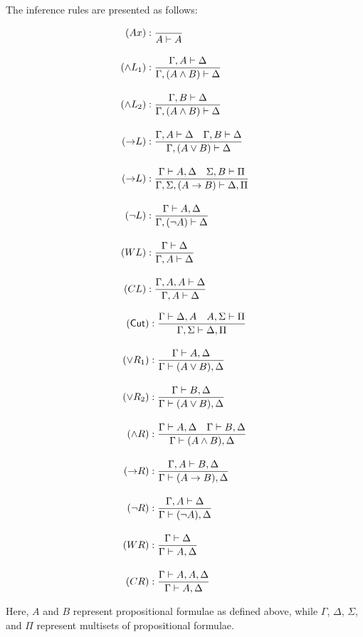 \begin{definition}
    The inference rules are presented as follows:
    \vspace{-11pt}
    \begin{center}
        \derivationfont
        \begin{minipage}{.4\textwidth}
            \begin{align*}
                (Ax) &: \frac{}{A \vdash A} \\[1em]
                (\land L_1) &: \frac{\Gamma, A \vdash \Delta}{\Gamma, (A \land B) \vdash \Delta} \\[1em]
                (\land L_2) &: \frac{\Gamma, B \vdash \Delta}{\Gamma, (A \land B) \vdash \Delta} \\[1em]
                (\mathord{\to} L) &: \frac{\Gamma, A \vdash \Delta \quad \Gamma, B \vdash \Delta}{\Gamma, (A \lor B) \vdash \Delta} \\[1em]
                (\mathord{\to} L) &: \frac{\Gamma \vdash A, \Delta \quad \Sigma, B \vdash \Pi}{\Gamma, \Sigma, (A \to B) \vdash \Delta, \Pi} \\[1em]
                (\lnot L) &: \frac{\Gamma \vdash A, \Delta}{\Gamma, (\lnot A) \vdash \Delta} \\[1em]
                (WL) &: \frac{\Gamma \vdash \Delta}{\Gamma, A \vdash \Delta} \\[1em]
                (CL) &: \frac{\Gamma, A, A \vdash \Delta}{\Gamma, A \vdash \Delta}
            \end{align*}
        \end{minipage}%
        \begin{minipage}{.4\textwidth}
            \begin{align*}
                (\textsf{Cut}) &: \frac{\Gamma \vdash \Delta, A \quad A, \Sigma \vdash \Pi}{\Gamma, \Sigma \vdash \Delta, \Pi} \\[1em]
                (\lor R_1) &: \frac{\Gamma \vdash A, \Delta}{\Gamma \vdash (A \lor B), \Delta} \\[1em]
                (\lor R_2) &: \frac{\Gamma \vdash B, \Delta}{\Gamma \vdash (A \lor B), \Delta} \\[1em]
                (\land R) &: \frac{\Gamma \vdash A, \Delta \quad \Gamma \vdash B, \Delta}{\Gamma \vdash (A \land B), \Delta} \\[1em]
                (\mathord{\to} R) &: \frac{\Gamma, A \vdash B, \Delta}{\Gamma \vdash (A \to B), \Delta} \\[1em]
                (\lnot R) &: \frac{\Gamma, A \vdash \Delta}{\Gamma \vdash (\lnot A), \Delta} \\[1em]
                (WR) &: \frac{\Gamma \vdash \Delta}{\Gamma \vdash A, \Delta} \\[1em]
                (CR) &: \frac{\Gamma \vdash A, A, \Delta}{\Gamma \vdash A, \Delta}
            \end{align*}
        \end{minipage}
    \end{center}
    Here, $A$ and $B$ represent propositional formulae as defined above, while $\Gamma$, $\Delta$, $\Sigma$, and $\Pi$ represent multisets of propositional formulae.
\end{definition}
